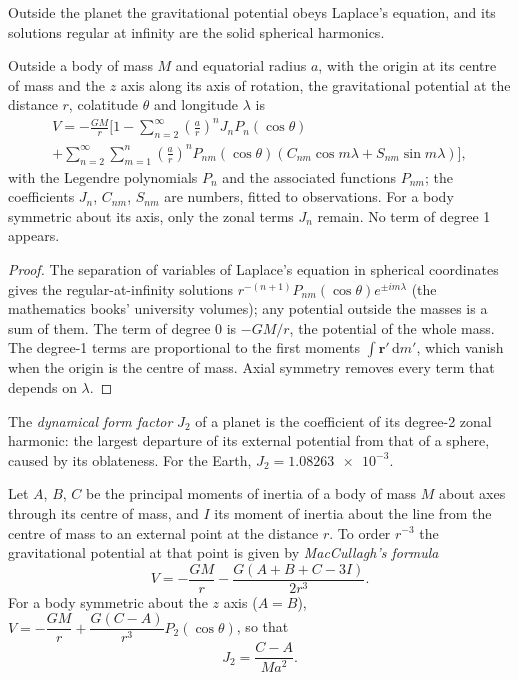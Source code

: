 Outside the planet the gravitational potential obeys Laplace's equation, and
its solutions regular at infinity are the solid spherical harmonics.

\begin{proposition}\label{prop:b3:gravity-geodesy:harmonics}
Outside a body of mass $M$ and equatorial radius $a$, with the origin at its
centre of mass and the $z$ axis along its axis of rotation, the gravitational
potential at the distance $r$, colatitude $\theta$ and longitude $\lambda$ is
\begin{multline*}
  V = -\frac{GM}{r}\Biggl[1 - \sum_{n=2}^{\infty}\left(\frac ar\right)^nJ_nP_n(\cos\theta)\\
  + \sum_{n=2}^{\infty}\sum_{m=1}^{n}\left(\frac ar\right)^nP_{nm}(\cos\theta)
  (C_{nm}\cos m\lambda + S_{nm}\sin m\lambda)\Biggr],
\end{multline*}
with the Legendre polynomials $P_n$ and the associated functions $P_{nm}$; the
coefficients $J_n$, $C_{nm}$, $S_{nm}$ are numbers, fitted to observations. For
a body symmetric about its axis, only the zonal terms $J_n$ remain. No term of
degree 1 appears.
\end{proposition}

\begin{proof}
The separation of variables of Laplace's equation in spherical coordinates
gives the regular-at-infinity solutions $r^{-(n+1)}P_{nm}(\cos\theta)e^{\pm
im\lambda}$ (the mathematics books' university volumes); any potential outside
the masses is a sum of them. The term of degree 0 is $-GM/r$, the potential of
the whole mass. The degree-1 terms are proportional to the first moments
$\int\mathbf r'\,\mathrm dm'$, which vanish when the origin is the centre of
mass. Axial symmetry removes every term that depends on $\lambda$.
\end{proof}

\begin{definition}\label{def:b3:gravity-geodesy:j2}
The \emph{dynamical form factor} $J_2$ of a planet
is the coefficient of its degree-2 zonal harmonic: the largest departure of its
external potential from that of a sphere, caused by its oblateness. For the
Earth, $J_2 = \num{1.08263e-3}$.
\end{definition}

\begin{theorem}\label{thm:b3:gravity-geodesy:maccullagh}
Let $A$, $B$, $C$ be the principal moments of inertia of a body of mass $M$
about axes through its centre of mass, and $I$ its moment of inertia about the
line from the centre of mass to an external point at the distance $r$. To order
$r^{-3}$ the gravitational potential at that point is given by
\emph{MacCullagh's formula}
\[
  V = -\frac{GM}{r} - \frac{G(A + B + C - 3I)}{2r^3} .
\]
For a body symmetric about the $z$ axis ($A = B$),
$V = -\dfrac{GM}{r} + \dfrac{G(C - A)}{r^3}P_2(\cos\theta)$, so that
\[
  J_2 = \frac{C - A}{Ma^2} .
\]
\end{theorem}

